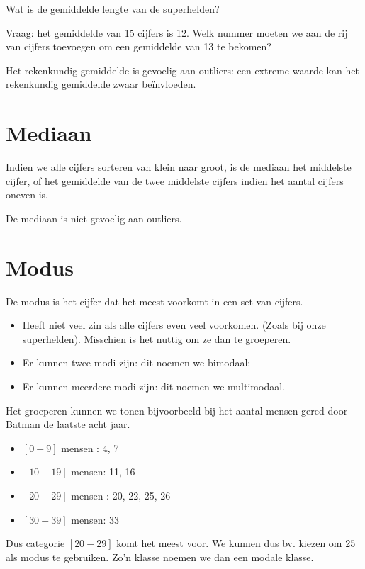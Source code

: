\begin{exercise}
  Wat is de gemiddelde lengte van de superhelden?
\end{exercise}

\begin{exercise}
  Vraag: het gemiddelde van 15 cijfers is 12. Welk nummer moeten
  we aan de rij van cijfers toevoegen om een gemiddelde van 13 te bekomen?
\end{exercise}

Het rekenkundig gemiddelde is gevoelig aan outliers: een extreme waarde kan het rekenkundig gemiddelde zwaar be\"invloeden.

\section{Mediaan}

\begin{definition}[Mediaan]
  Indien we alle cijfers sorteren van klein naar groot, is de  mediaan het middelste cijfer, of het gemiddelde van de twee middelste cijfers indien het aantal cijfers oneven is.
\end{definition}

De mediaan is niet gevoelig aan outliers.

\section{Modus}
\begin{definition}[Modus]
  De  modus is het cijfer dat het meest voorkomt in een set van cijfers.
\end{definition}

\begin{itemize}
  \item Heeft niet veel zin als alle cijfers even veel voorkomen. (Zoals bij onze superhelden). Misschien is het nuttig om ze dan te groeperen.
  \item Er kunnen twee modi zijn: dit noemen we  bimodaal;
  \item Er kunnen meerdere modi zijn: dit noemen we  multimodaal.
\end{itemize}

\begin{example}
  Het groeperen kunnen we tonen bijvoorbeeld bij het aantal mensen gered door Batman de laatste acht jaar.
  \begin{itemize}
    \item $[0-9]$ mensen : 4, 7
    \item $[10-19]$ mensen: 11, 16
    \item $[20-29]$ mensen : 20, 22, 25, 26
    \item $[30-39]$ mensen: 33
  \end{itemize}
  Dus categorie $[20-29]$ komt het meest voor. We kunnen dus bv. kiezen om 25 als modus te gebruiken. Zo'n klasse noemen we dan een modale klasse.
\end{example}

